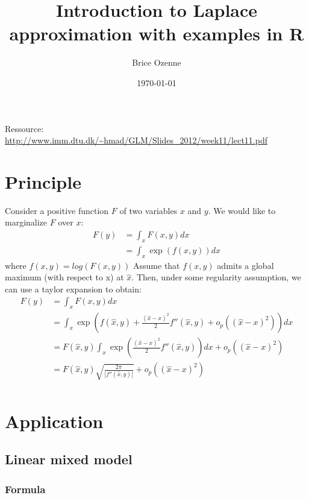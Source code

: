 \documentclass[12pt]{article}
\author{Brice Ozenne}
\date{\today}
\title{Introduction to Laplace approximation with examples in R}
\begin{document}
\maketitle
Ressource: \url{http://www.imm.dtu.dk/\~hmad/GLM/Slides\_2012/week11/lect11.pdf}


\section{Principle}
\label{sec:orgb36e54d}

Consider a positive function \(F\) of two variables \(x\) and \(y\). We would
like to marginalize \(F\) over \(x\):
\begin{align*}
F(y) &= \int_x F(x,y) dx \\
&= \int_x \exp( f(x,y) ) dx
\end{align*}
where \(f(x,y)=log(F(x,y))\) Assume that \(f(x,y)\) admits a global
maximum (with respect to x) at \(\hat{x}\). Then, under some
regularity assumption, we can use a taylor expansion to obtain:
\begin{align*}
F(y) &= \int_x F(x,y) dx \\
&= \int_x \exp\left( f(\hat{x},y) + \frac{(\hat{x}-x)^2}{2} f''(\hat{x},y) + o_p\left((\hat{x}-x)^2\right) \right) dx \\
&= F(\hat{x},y)  \int_x \exp\left( \frac{(\hat{x}-x)^2}{2} f''(\hat{x},y)\right)  dx + o_p\left((\hat{x}-x)^2\right) \\
&= F(\hat{x},y)  \sqrt{\frac{2\pi}{|f''(\hat{x},y)|}} + o_p\left((\hat{x}-x)^2\right) \\
\end{align*}

\clearpage

\section{Application}
\label{sec:orgf14ece3}

\subsection{Linear mixed model}
\label{sec:org3b2c859}

\subsubsection{Formula}
\label{sec:org733ea7a}
\end{document}
